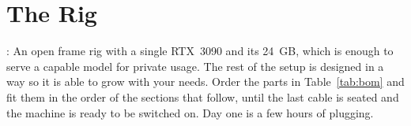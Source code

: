 %
%
%
%

%
\chapter{The Rig}
\vspace{1.5em}

: An open frame rig with a single
RTX~3090 and its 24~GB, which is enough to serve a capable model for private usage.
The rest of the setup is designed in a way so it is able to grow with your needs.
Order the parts in Table~\ref{tab:bom} and fit them in the order of the sections
that follow, until the last cable is seated and the machine is ready to be switched
on. Day one is a few hours of plugging.

